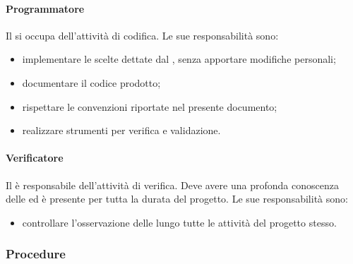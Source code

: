 			\paragraph{Programmatore}
			Il \programmatore{} si occupa dell'attività di codifica. Le sue responsabilità sono:
			\begin{itemize}
				\item implementare le scelte dettate dal \progettista{}, senza apportare modifiche personali;
				\item documentare il codice prodotto;
				\item rispettare le convenzioni riportate nel presente documento;
				\item realizzare strumenti per verifica e validazione.
			\end{itemize}
			\paragraph{Verificatore}
			Il \verificatore{} è responsabile dell'attività di verifica. Deve avere una profonda conoscenza delle \ndp{} ed è presente per tutta la durata del progetto. Le sue responsabilità sono:
			\begin{itemize}
				\item controllare l'osservazione delle \ndp{} lungo tutte le attività del progetto stesso.
			\end{itemize}
        \subsubsection{Procedure}

